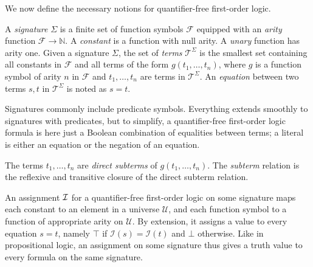 \documentclass[smallextended]{svjour3}
\begin{document}
We now define the necessary notions for quantifier-free first-order logic.
\begin{definition}
A \emph{signature} $\Sigma$ is a finite set of function symbols $\mathcal{F}$
equipped with an \emph{arity} function $\mathcal{F} \rightarrow \mathbb{N}$.  A
\emph{constant} is a function with null arity.  A \emph{unary} function has
arity one.  Given a signature $\Sigma$, the set of \emph{terms}
$\mathcal{T}^{\Sigma}$ is the smallest set containing all constants in
$\mathcal{F}$ and all terms of the form $g(t_1,\ldots, t_n)$, where $g$ is a
function symbol of arity $n$ in $\mathcal{F}$ and $t_1,\ldots,t_n$ are terms in $\mathcal{T}^{\Sigma}$.  An \emph{equation} between two terms $s,t$ in $\mathcal{T}^{\Sigma}$ is noted as $s=t$.
\end{definition}
Signatures commonly include predicate symbols.  Everything extends smoothly to
signatures with predicates, but to simplify, a quantifier-free first-order logic
formula is here just a Boolean combination of equalities between terms; a
literal is either an equation or the negation of an equation.

The terms $t_1,\ldots,t_n$ are \emph{direct subterms} of $g(t_1,\ldots,t_n)$.  The \emph{subterm} relation is the reflexive and transitive closure of the direct subterm relation.

An assignment ${\cal I}$ for a quantifier-free first-order logic on some
signature maps each constant to an element in a universe $\mathcal{U}$, and each
function symbol to a function of appropriate arity on $\mathcal{U}$.  By
extension, it assigns a value to every equation $s=t$, namely $\top$ if
$\mathcal{I}(s) = \mathcal{I}(t)$ and $\bot$ otherwise.  Like in propositional
logic, an assignment on some signature thus gives a truth value to every formula
on the same signature.
\end{document}

